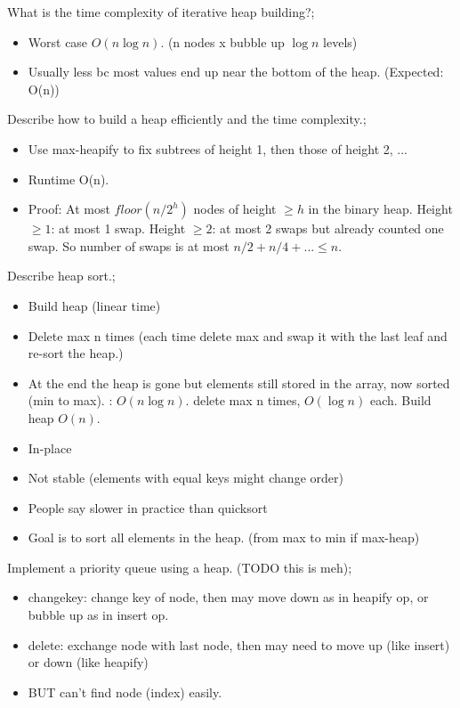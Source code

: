 \documentclass{article}
\begin{document}
What is the time complexity of iterative heap building?; \begin{itemize} \item Worst case $O(n\log n)$. (n nodes x bubble up $\log n$ levels) \item Usually less bc most values end up near the bottom of the heap. (Expected: O(n)) \end{itemize}

Describe how to build a heap efficiently and the time complexity.; \begin{itemize} \item Use max-heapify to fix subtrees of height 1, then those of height 2, ...  \item Runtime O(n).  \item Proof: At most $floor(n/2^h)$ nodes of height $\geq h$ in the binary heap. Height $\geq 1$: at most 1 swap. Height $\geq 2$: at most 2 swaps but already counted one swap. So number of swaps is at most $n/2+n/4+...\leq n$.  \end{itemize}

Describe heap sort.; \begin{itemize} \item Build heap (linear time) \item Delete max n times (each time delete max and swap it with the last leaf and re-sort the heap.) \item At the end the heap is gone but elements still stored in the array, now sorted (min to max).  \Runtime: $O(n\log n)$. delete max n times, $O(\log n)$ each. Build heap $O(n)$.  \item In-place \item Not stable (elements with equal keys might change order) \item People say slower in practice than quicksort \item Goal is to sort all elements in the heap. (from max to min if max-heap) \end{itemize}

Implement a priority queue using a heap. (TODO this is meh); \begin{itemize} \item changekey: change key of node, then may move down as in heapify op, or bubble up as in insert op.  \item delete: exchange node with last node, then may need to move up (like insert) or down (like heapify) \item BUT can't find node (index) easily.  \end{itemize}
\end{document}
